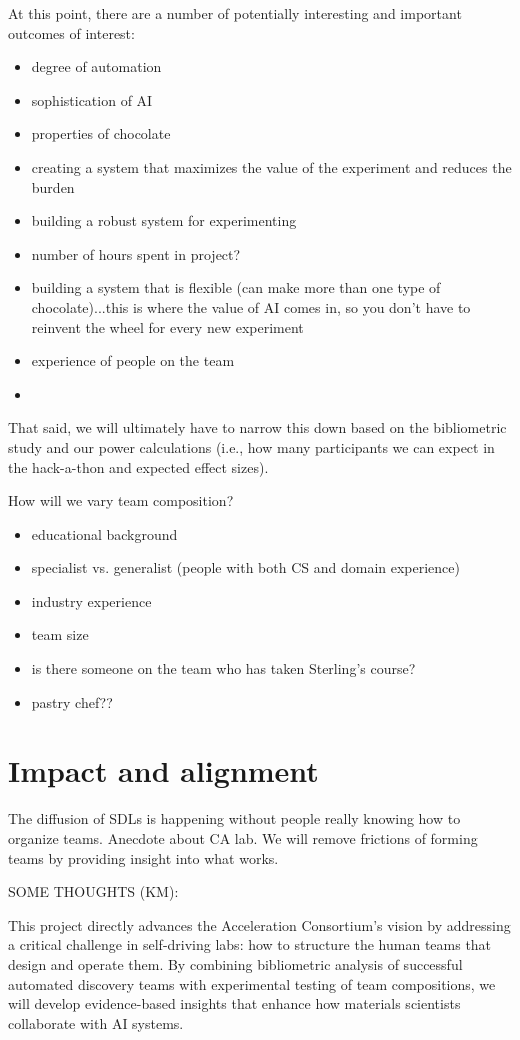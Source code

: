 \documentclass{article}
\begin{document}
At this point, there are a number of potentially interesting and important outcomes of interest:
\begin{itemize}
    \item  degree of automation
    \item  sophistication of AI
    \item  properties of chocolate
    \item  creating a system that maximizes the value of the experiment and reduces the burden
    \item  building a robust system for experimenting
    \item number of hours spent in project?
    \item  building a system that is flexible (can make more than one type of chocolate)...this is where the value of AI comes in, so you don't have to reinvent the wheel for every new experiment
    \item experience of people on the team
    \item 
\end{itemize}
That said, we will ultimately have to narrow this down based on the bibliometric study and our power calculations (i.e., how many participants we can expect in the hack-a-thon and expected effect sizes).

How will we vary team composition?
\begin{itemize}
\item {educational background}
\item{specialist vs. generalist (people with both CS and domain experience)}
\item{industry experience}
\item{team size}
\item{is there someone on the team who has taken Sterling's course?}
\item{pastry chef??}
\end{itemize}

\section{Impact and alignment}
The diffusion of SDLs is happening without people really knowing how to organize teams. Anecdote about CA lab. We will remove frictions of forming teams by providing insight into what works.

SOME THOUGHTS (KM):

This project directly advances the Acceleration Consortium's vision by addressing a critical challenge in self-driving labs: how to structure the human teams that design and operate them. By combining bibliometric analysis of successful automated discovery teams with experimental testing of team compositions, we will develop evidence-based insights that enhance how materials scientists collaborate with AI systems.
\end{document}
